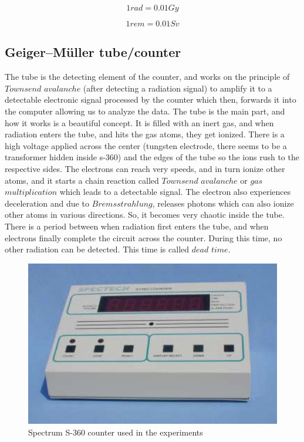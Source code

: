 \documentclass[twocolumn]{article}
\begin{document}
\begin{equation*}
1rad=0.01Gy
\end{equation*}

\begin{equation*}
1rem=0.01Sv
\end{equation*}


\subsection*{Geiger–Müller tube/counter}
The tube is the detecting element of the counter, and works on the principle of $Townsend$ $avalanche$ (after detecting a radiation signal) to amplify it to a detectable electronic signal processed by the counter which then, forwards it into the computer allowing us to analyze the data. The tube is the main part, and how it works is a beautiful concept. It is filled with an inert gas, and when radiation enters the tube, and hits the gas atoms, they get ionized. There is a high voltage applied across the center (tungsten electrode, there seems to be a transformer hidden inside s-360) and the edges of the tube so the ions rush to the respective sides.  The electrons can reach very speeds, and in turn ionize other atoms, and it starts a chain reaction called $Townsend$ $avalanche$ or $gas$ $multiplication$ which leads to a detectable signal. The electron also experiences deceleration and due to $Bremsstrahlung$, releases photons which can also ionize other atoms in various directions. So, it becomes very chaotic inside the tube. There is a period between when radiation first enters the tube, and when electrons finally complete the circuit across the counter. During this time, no other radiation can be detected. This time is called $dead$ $time$. 
\begin{center}
\begin{figure}[t!]
\includegraphics[scale=0.45]{counter.png}
\caption{Spectrum S-360 counter used in the experiments}
\end{figure}
\end{center}
\end{document}

